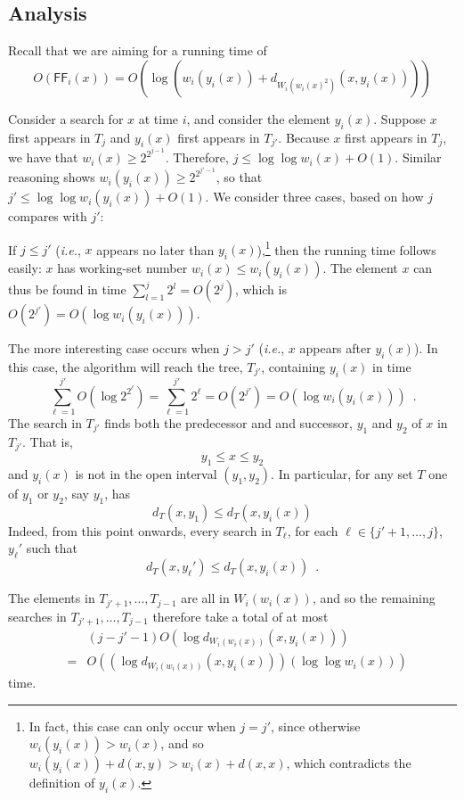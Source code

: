 \documentclass{llncs}
\newcommand{\ie}{\textsl{i.e.}}
\newcommand{\BigOh}[1]{O\!\left(#1\right)}
\newcommand{\SU}[1]{\textsf{FF}_i\!\left(#1\right)}
\newcommand{\pat}[1]{\textcolor{red}{(PM Says: #1)}}
\begin{document}
\subsection{Analysis}
\label{section:main:analysis}

Recall that we are aiming for a running time of
\begin{displaymath}
	\BigOh{\SU{x}} = \BigOh{\log (w_i(y_i(x)) + d_{W_i(w_i(x)^2)}(x,y_i(x)))}
\end{displaymath}

Consider a search for $x$ at time $i$, and consider the element $y_i(x)$. Suppose $x$ first appears in $T_j$ and $y_i(x)$ first appears in $T_{j'}$. Because $x$ first appears in $T_j$, we have that $w_i(x) \ge 2^{2^{j-1}}$. Therefore, $j \le \log \log w_i(x) + \BigOh{1}$. Similar reasoning shows $w_i(y_i(x)) \ge 2^{2^{j'-1}}$, so that $j' \le \log \log w_i(y_i(x)) + \BigOh{1}$. We consider three cases, based on how $j$ compares with $j'$:

If $j \le j'$ (\ie, $x$ appears no later than $y_i(x)$),\footnote{In fact, this case can only occur when $j=j'$, since otherwise $w_i(y_i(x)) > w_i(x)$, and so $w_i(y_i(x)) + d(x,y) > w_i(x) + d(x,x)$, which contradicts the definition of $y_i(x)$.} then the running time follows easily: $x$ has working-set number $w_i(x) \le w_i(y_i(x))$. The element $x$ can thus be found in time $\sum_{l=1}^j 2^l = \BigOh{2^j}$, which is $\BigOh{2^{j'}} = \BigOh{\log w_i(y_i(x))}$.



The more interesting case occurs when $j > j'$ (\ie, $x$ appears after $y_i(x)$).  In this case, the algorithm will reach the tree, $T_{j'}$, containing $y_i(x)$ in time 
\[  
    \sum_{\ell=1}^{j'} \BigOh{\log 2^{2^\ell}}=\sum_{\ell=1}^{j'} 2^\ell = \BigOh{2^{j'}} = \BigOh{\log w_i(y_i(x))}
    \enspace .
\]
The search in $T_{j'}$ finds both the predecessor and and successor, $y_1$ and $y_2$ of $x$ in $T_{j'}$.  That is,
\[
       y_1 \le x \le y_2
\]
and $y_i(x)$ is not in the open interval $(y_1,y_2)$.  In particular,
for any set $T$ one of $y_1$ or $y_2$, say $y_1$, has
\[
    d_{T}(x,y_1) \le d_{T}(x,y_i(x))
\]
Indeed, from this point onwards, every search in $T_{\ell}$, for each $\ell\in\{j'+1,\ldots,j\}$, $y_\ell'$ such that
\[
    d_{T}(x,y_\ell') \le d_{T}(x,y_i(x)) \enspace .
\]

The elements in $T_{j'+1},\ldots,T_{j-1}$ are all in $W_i(w_i(x))$, and so
the remaining searches in $T_{j'+1},\ldots,T_{j-1}$ therefore take a total of at most
\begin{eqnarray*}
&&(j-j'-1)\BigOh{\log d_{W_i(w_i(x))}(x,y_i(x))}\\
&=&\BigOh{(\log d_{W_i(w_i(x))}(x,y_i(x)))(\log\log w_i(x))}
\end{eqnarray*}
time.
\end{document}
